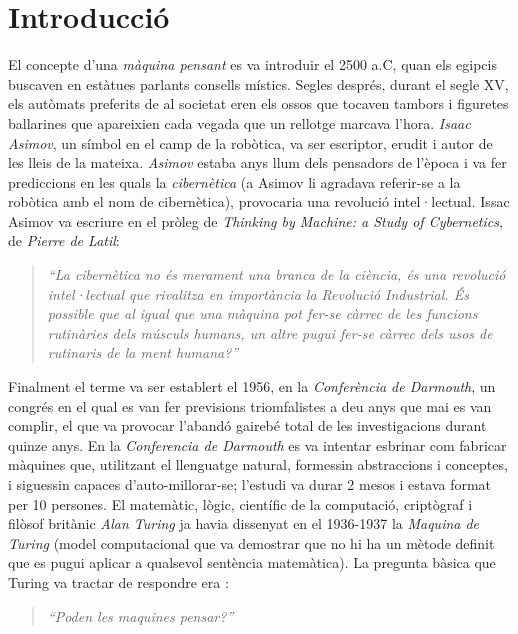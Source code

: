 \section{Introducció}

El concepte d'una \emph{màquina pensant} es va introduir el 2500 a.C, quan els egipcis buscaven en estàtues parlants consells místics. Segles després, durant el segle XV, els autòmats preferits de al societat eren els ossos que tocaven tambors i figuretes ballarines que apareixien cada vegada que un rellotge marcava l'hora. \emph{Isaac Asimov}, un símbol en el camp de la robòtica, va ser escriptor, erudit i autor de les lleis de la mateixa. \emph{Asimov} estaba anys llum dels pensadors de l'època i va fer prediccions en les quals la \emph{cibernètica} (a Asimov li agradava referir-se a la robòtica amb el nom de cibernètica), provocaria una revolució intel·lectual. 
Issac Asimov va escriure en el pròleg de \emph{Thinking by Machine: a Study of Cybernetics}, de \emph{Pierre de Latil}:

\begin{quote}
\emph{``La cibernètica no és merament una branca de la ciència, és una revolució intel·lectual que rivalitza en importància la Revolució Industrial. És possible que al igual que una màquina pot fer-se càrrec de les funcions rutinàries dels músculs humans, un altre pugui fer-se càrrec dels usos de rutinaris de la ment humana?''}

\end{quote}

Finalment el terme va ser establert el 1956, en la \emph{Conferència de Darmouth}, un congrés en el qual es van fer previsions triomfalistes a deu anys que mai es van complir, el que va provocar l'abandó gairebé total de les investigacions durant quinze anys. En la \emph{Conferencia de Darmouth} es va intentar esbrinar com fabricar màquines que, utilitzant el llenguatge natural, formessin abstraccions i conceptes, i siguessin capaces d'auto-millorar-se; l'estudi va durar 2 mesos i estava format per 10 persones. El matemàtic, lògic, científic de la computació, criptògraf  i filòsof britànic \emph{Alan Turing} ja havia dissenyat en el 1936-1937 la \emph{Maquina de Turing} (model computacional que va demostrar que no hi ha un mètode definit que es pugui aplicar a qualsevol sentència matemàtica). La pregunta bàsica que Turing va tractar de respondre era \cite{MaTur} \cite{Algor}: 

\begin{quote}
	\emph{``Poden les maquines pensar?''}
\end{quote}

